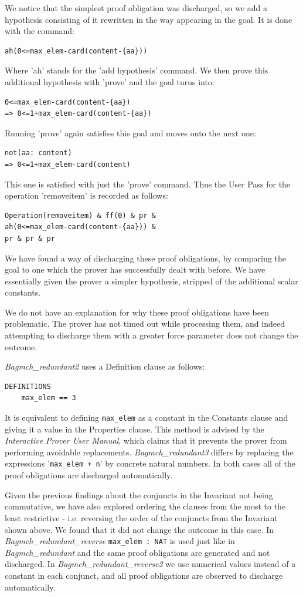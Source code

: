 \documentclass[12pt,journal,duplex]{IEEEtran}
\begin{document}
	We notice that the simplest proof obligation was discharged, so we add a hypothesis consisting of it rewritten in the way appearing in the goal. It is done with the command:
	\begin{lstlisting}
ah(0<=max_elem-card(content-{aa}))
	\end{lstlisting}
	Where 'ah' stands for the 'add hypothesis' command. We then prove this additional hypothesis with 'prove' and the goal turns into:
	\begin{lstlisting}
0<=max_elem-card(content-{aa})
=> 0<=1+max_elem-card(content-{aa})
	\end{lstlisting}
	Running 'prove' again satisfies this goal and moves onto the next one:
	\begin{lstlisting}
not(aa: content)
=> 0<=1+max_elem-card(content)
	\end{lstlisting}
	This one is satisfied with just the 'prove' command. Thus the User Pass for the operation 'removeitem' is recorded as follows:
	\begin{lstlisting}
Operation(removeitem) & ff(0) & pr &
ah(0<=max_elem-card(content-{aa})) &
pr & pr & pr
	\end{lstlisting}
	We have found a way of discharging these proof obligations, by comparing the goal to one which the prover has successfully dealt with before. We have essentially given the prover a simpler hypothesis, stripped of the additional scalar constants.

	We do not have an explanation for why these proof obligations have been problematic. The prover has not timed out while processing them, and indeed attempting to discharge them with a greater force parameter does not change the outcome.

	\emph{Bagmch\_redundant2} uses a Definition clause as follows:
	\begin{lstlisting}
DEFINITIONS
	max_elem == 3
	\end{lstlisting}
	It is equivalent to defining \texttt{max\_elem} as a constant in the Constants clause and giving it a value in the Properties clause. This method is advised by the \emph{Interactive Prover User Manual}\cite{Prover guide}, which claims that it prevents the prover from performing avoidable replacements. \emph{Bagmch\_redundant3} differs by replacing the expressions '\texttt{max\_elem + n}' by concrete natural numbers. In both cases all of the proof obligations are discharged automatically.

	Given the previous findings about the conjuncts in the Invariant not being commutative, we have also explored ordering the clauses from the most to the least restrictive - i.e. reversing the order of the conjuncts from the Invariant shown above. We found that it did not change the outcome in this case. In \emph{Bagmch\_redundant\_reverse} \texttt{max\_elem : NAT} is used just like in \emph{Bagmch\_redundant} and the same proof obligations are generated and not discharged. In \emph{Bagmch\_redundant\_reverse2} we use numerical values instead of a constant in each conjunct, and all proof obligations are observed to discharge automatically.
\end{document}
